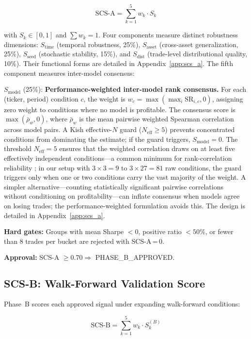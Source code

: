 \documentclass[12pt,a4paper]{article}
\begin{document}
\begin{equation}
  \text{SCS-A} = \sum_{k=1}^{5} w_k \cdot S_k
\end{equation}

with $S_k \in [0, 1]$ and $\sum w_k = 1$. Four components measure distinct robustness dimensions: $S_{\text{time}}$ (temporal robustness, 25\%), $S_{\text{asset}}$ (cross-asset generalization, 25\%), $S_{\text{seed}}$ (stochastic stability, 15\%), and $S_{\text{dist}}$ (trade-level distributional quality, 10\%). Their functional forms are detailed in Appendix~\ref{app:scs_a}. The fifth component measures inter-model consensus:

$S_{\text{model}}$ (25\%): \textbf{Performance-weighted inter-model rank consensus.} For each (ticker, period) condition $c$, the weight is $w_c = \max(\max_i \text{SR}_{i,c}, 0)$, assigning zero weight to conditions where no model is profitable. The consensus score is $\max(\bar{\rho}_w, 0)$, where $\bar{\rho}_w$ is the mean pairwise weighted Spearman correlation across model pairs. A Kish effective-$N$ guard \citep{kish1965survey} ($N_{\text{eff}} \geq 5$) prevents concentrated conditions from dominating the estimate; if the guard triggers, $S_{\text{model}} = 0$. The threshold $N_{\text{eff}}=5$ ensures that the weighted correlation draws on at least five effectively independent conditions---a common minimum for rank-correlation reliability \citep{kish1965survey}; in our setup with $3 \times 3 = 9$ to $3 \times 27 = 81$ raw conditions, the guard triggers only when one or two conditions carry the vast majority of the weight. A simpler alternative---counting statistically significant pairwise correlations without conditioning on profitability---can inflate consensus when models agree on losing trades; the performance-weighted formulation avoids this. The design is detailed in Appendix~\ref{app:scs_a}.

\textbf{Hard gates:} Groups with mean Sharpe $< 0$, positive ratio $< 50\%$, or fewer than 8 trades per bucket are rejected with SCS-A\,=\,0.

\textbf{Approval:} SCS-A $\geq 0.70 \Rightarrow$ PHASE\_B\_APPROVED.

\subsection{SCS-B: Walk-Forward Validation Score}

Phase~B scores each approved signal under expanding walk-forward conditions:

\begin{equation}
  \text{SCS-B} = \sum_{k=1}^{5} w_k \cdot S_k^{(B)}
\end{equation}
\end{document}
